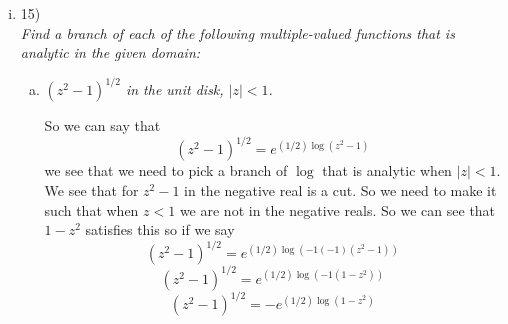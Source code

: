 \documentclass[11pt]{article}
\newcommand{\Log}{\textnormal{Log}}
\begin{document}
\begin{enumerate}
\begin{enumerate}[(i)]
\begin{enumerate}[(a)]
\item
\newtheorem{theo6b}{Theorem}
\begin{theo6b}
$z^{\alpha}z^{\beta}= z^{\alpha+\beta}$
\end{theo6b}
\begin{proof}
\begin{align*}
z^{\alpha}z^{\beta} &= e^{\alpha\Log(z)}e^{\beta\Log(z)}\\
 &= e^{\alpha\Log(z)+\beta\Log(z)}\\
 &= e^{\Log(z)(\alpha+\beta)}\\
 &= e^{(\alpha+\beta)\Log(z)}\\
 &= e^{\Log(z^{(\alpha+\beta)})}\\
z^{\alpha}z^{\beta} &= z^{\alpha+\beta}
\end{align*}
\end{proof}

\item
\newtheorem{theo6c}{Theorem}
\begin{theo6c}
$\frac{z^{\alpha}}{z^{\beta}}= z^{\alpha-\beta}$
\end{theo6c}
\begin{proof}
\begin{align*}
\frac{z^{\alpha}}{z^{\beta}} &= \frac{e^{\alpha\Log(z)}}{e^{\beta\Log(z)}}\\
&= {e^{\alpha\Log(z)}}{e^{-\beta\Log(z)}}\\
&= {e^{\alpha\Log(z)-\beta\Log(z)}}\\
&= {e^{\Log(z)(\alpha-\beta)}}\\
&= {e^{(\alpha-\beta)\Log(z)}}\\
&= {e^{\Log(z^{(\alpha-\beta)})}}\\
\frac{z^{\alpha}}{z^{\beta}} &= z^{\alpha-\beta}
\end{align*}
\end{proof}
\end{enumerate}

\item 15)\\
\textit{Find a branch of each of the following multiple-valued functions that is analytic in the given domain:}
\begin{enumerate}[(a)]
\item\textit{$(z^2-1)^{1/2}$ in the unit disk, $|z| < 1$.}

So we can say that 
$$(z^2-1)^{1/2} = e^{(1/2)\log(z^2-1)}$$
we see that we need to pick a branch of $\log$ that is analytic when $|z|<1$. We see that for $z^2-1$ in the negative real is a cut. So we need to make it such that when $z<1$ we are not in the negative reals. So we can see that $1-z^2$ satisfies this so if we say 
$$(z^2-1)^{1/2} = e^{(1/2)\log(-1(-1)(z^2-1))}$$
$$(z^2-1)^{1/2} = e^{(1/2)\log(-1(1-z^2))}$$
$$(z^2-1)^{1/2} = -e^{(1/2)\log(1-z^2)}$$


\end{enumerate}
\end{enumerate}
\end{enumerate}
\end{document}
